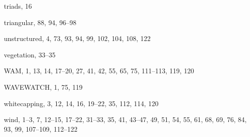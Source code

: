 \documentclass[12pt]{book}
\begin{document}
\begin{theindex}
  \indexspace

  \item triads, 16
  \item triangular, 88, 94, 96--98

  \indexspace

  \item unstructured, 4, 73, 93, 94, 99, 102, 104, 108, 122

  \indexspace

  \item vegetation, 33--35

  \indexspace

  \item WAM, 1, 13, 14, 17--20, 27, 41, 42, 55, 65, 75, 111--113,
		119, 120
  \item WAVEWATCH, 1, 75, 119
  \item whitecapping, 3, 12, 14, 16, 19--22, 35, 112, 114, 120
  \item wind, 1--3, 7, 12--15, 17--22, 31--33, 35, 41, 43--47, 49, 51,
		54, 55, 61, 68, 69, 76, 84, 93, 99, 107--109, 112--122

\end{theindex}
\end{document}
